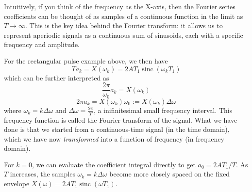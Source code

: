 Intuitively, if you think of the frequency as the X-axis, then the Fourier series coefficients can be thought of as samples of a continuous function in the limit as $T \to \infty$. This is the key idea behind the Fourier transform: it allows us to represent aperiodic signals as a continuous sum of sinusoids, each with a specific frequency and amplitude.

For the rectangular pulse example above, we then have
\[
T a_k = X(\omega_k)=2 A T_1\operatorname{sinc}(\omega_k T_1)
\]
which can be further interpreted as  
\[
\frac{2\pi}{\omega_0} a_k = X(\omega_k)
\]
\[
2 \pi a_k = X(\omega_k) \omega_0 := X(\omega_k) \Delta \omega
\]
where $\omega_k = k \Delta \omega$ and $\Delta \omega = \frac{2\pi}{T}$, a inifinitesimal small frequency interval. 
This frequency function is called the Fourier transform of the signal. What we have done is that we started from a continuous-time signal (in the time domain), which we have now \emph{transformed} into a function of frequency (in frequency domain).

For $k=0$, we can evaluate the coefficient integral directly to get
$a_0=2AT_1/T$.
As $T$ increases, the samples $\omega_k=k\Delta\omega$ become more closely
spaced on the fixed envelope $X(\omega)=2AT_1\operatorname{sinc}(\omega T_1)$.

